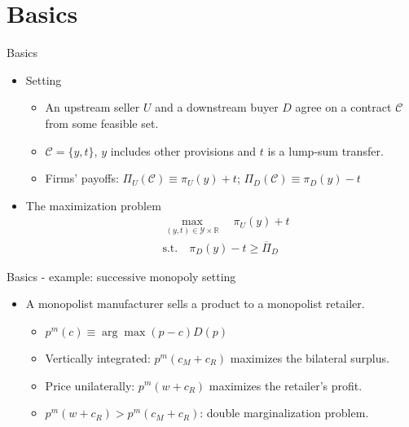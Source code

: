 \documentclass[aspectratio=169]{beamer}  %
\begin{document}
\section{Basics}
\begin{frame}{Basics}
    \begin{itemize}
        \item Setting \vspace{.2cm}
        \begin{itemize}
            \item An upstream seller $U$ and a downstream buyer $D$ agree on a contract $\mathcal{C}$ from some feasible set. \vspace{.2cm}
            \item $\mathcal{C} = \{y, t\}$, $y$ includes other provisions and $t$ is a lump-sum transfer. \vspace{.2cm}
            \item Firms' payoffs: $\Pi_U(\mathcal{C})\equiv \pi_U(y) + t$; $\Pi_D(\mathcal{C})\equiv \pi_D(y) - t$ \vspace{.2cm}
        \end{itemize}
        \item The maximization problem \vspace{.2cm}
        \begin{equation}
            \begin{aligned}
            & \max_{(y, t) \in \mathcal{Y} \times \mathbb{R}} \quad \pi_U(y) + t \\
            & \text{s.t.} \quad \pi_D(y) - t \geq \overline{\Pi}_D
            \end{aligned}
            \end{equation}
    \end{itemize}
\end{frame}



\begin{frame}{Basics - example: successive monopoly setting}
    \begin{itemize}
        \item A monopolist manufacturer sells a product to a monopolist retailer. \vspace{.2cm}
        \begin{itemize}
            \item $p^m(c)\equiv \arg\max (p-c)D(p)$ \vspace{.2cm}
            \item Vertically integrated: $p^m(c_M+c_R)$ maximizes the bilateral surplus. \vspace{.2cm}
            \item Price unilaterally: $p^m(w+c_R)$ maximizes the retailer's profit. \vspace{.2cm}
            \item $p^m(w+c_R) > p^m(c_M+c_R)$: double marginalization problem. \vspace{.2cm} 
        \end{itemize} 
    \end{itemize}
\end{frame}
\end{document}
